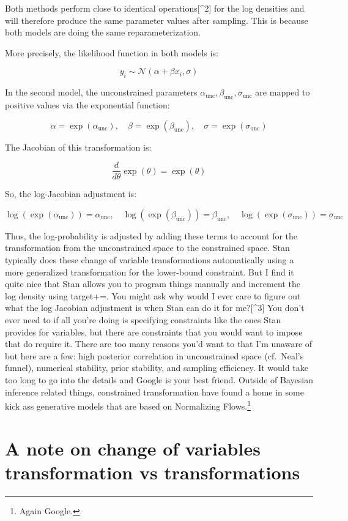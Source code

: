 \documentclass[
  letterpaper,
  DIV=11,
  numbers=noendperiod]{scrartcl}
\begin{document}
Both methods perform close to identical operations{[}\^{}2{]} for the
log densities and will therefore produce the same parameter values after
sampling. This is because both models are doing the same
reparameterization.

More precisely, the likelihood function in both models is:

\[
y_i \sim \mathcal{N}(\alpha + \beta x_i, \sigma)
\]

In the second model, the unconstrained parameters
\(\alpha_{\text{unc}}, \beta_{\text{unc}}, \sigma_{\text{unc}}\) are
mapped to positive values via the exponential function:

\[
\alpha = \exp(\alpha_{\text{unc}}), \quad \beta = \exp(\beta_{\text{unc}}), \quad \sigma = \exp(\sigma_{\text{unc}})
\]

The Jacobian of this transformation is:

\[
\frac{d}{d\theta} \exp(\theta) = \exp(\theta)
\]

So, the log-Jacobian adjustment is:

\[
\log(\exp(\alpha_{\text{unc}})) = \alpha_{\text{unc}}, \quad \log(\exp(\beta_{\text{unc}})) = \beta_{\text{unc}}, \quad \log(\exp(\sigma_{\text{unc}})) = \sigma_{\text{unc}}
\]

Thus, the log-probability is adjusted by adding these terms to account
for the transformation from the unconstrained space to the constrained
space. Stan typically does these change of variable transformations
automatically using a more generalized transformation for the
lower-bound constraint. But I find it quite nice that Stan allows you to
program things manually and increment the log density using target+=.
You might ask why would I ever care to figure out what the log Jacobian
adjustment is when Stan can do it for me?{[}\^{}3{]} You don't ever need
to if all you're doing is specifying constraints like the ones Stan
provides for variables, but there are constraints that you would want to
impose that do require it. There are too many reasons you'd want to that
I'm unaware of but here are a few: high posterior correlation in
unconstrained space (cf.~Neal's funnel), numerical stability, prior
stability, and sampling efficiency. It would take too long to go into
the details and Google is your best friend. Outside of Bayesian
inference related things, constrained transformation have found a home
in some kick ass generative models that are based on Normalizing
Flows.\footnote{Again Google.}

\section{A note on change of variables transformation vs
transformations}\label{a-note-on-change-of-variables-transformation-vs-transformations}
\end{document}
